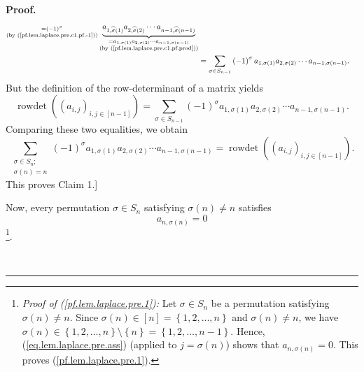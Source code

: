\documentclass
[numbers=enddot,12pt,final,onecolumn,notitlepage,english]{scrartcl}%
\theoremstyle{definition}
\newenvironment{proof}[1][Proof]{\noindent\textbf{#1.} }{\ \rule{0.5em}{0.5em}}
\let\sumnonlimits\sum
\renewcommand{\sum}{\sumnonlimits\limits}
\newenvironment{verlong}{}{}
\begin{document}
\begin{verlong}
\begin{proof}
\begin{align*}
{{}}_{\substack{=\left(  -1\right)  ^{\sigma}\\\text{(by
(\ref{pf.lem.laplace.pre.c1.pf.-1}))}}}\underbrace{a_{1,\widehat{\sigma
}\left(  1\right)  }a_{2,\widehat{\sigma}\left(  2\right)  }\cdots
a_{n-1,\widehat{\sigma}\left(  n-1\right)  }}_{\substack{=a_{1,\sigma\left(
1\right)  }a_{2,\sigma\left(  2\right)  }\cdots a_{n-1,\sigma\left(
n-1\right)  }\\\text{(by (\ref{pf.lem.laplace.pre.c1.pf.prod}))}}}\\
&  =\sum_{\sigma\in S_{n-1}}\left(  -1\right)  ^{\sigma}a_{1,\sigma\left(
1\right)  }a_{2,\sigma\left(  2\right)  }\cdots a_{n-1,\sigma\left(
n-1\right)  }.
\end{align*}
But the definition of the row-determinant of a matrix yields%
\[
\operatorname*{rowdet}\left(  \left(  a_{i,j}\right)  _{i,j\in\left[
n-1\right]  }\right)  =\sum_{\sigma\in S_{n-1}}\left(  -1\right)  ^{\sigma
}a_{1,\sigma\left(  1\right)  }a_{2,\sigma\left(  2\right)  }\cdots
a_{n-1,\sigma\left(  n-1\right)  }.
\]
Comparing these two equalities, we obtain%
\[
\sum_{\substack{\sigma\in S_{n};\\\sigma\left(  n\right)  =n}}\left(
-1\right)  ^{\sigma}a_{1,\sigma\left(  1\right)  }a_{2,\sigma\left(  2\right)
}\cdots a_{n-1,\sigma\left(  n-1\right)  }=\operatorname*{rowdet}\left(
\left(  a_{i,j}\right)  _{i,j\in\left[  n-1\right]  }\right)  .
\]
This proves Claim 1.] \medskip

Now, every permutation $\sigma\in S_{n}$ satisfying $\sigma\left(  n\right)
\neq n$ satisfies
\begin{equation}
a_{n,\sigma\left(  n\right)  }=0 \label{pf.lem.laplace.pre.1}%
\end{equation}
\footnote{\textit{Proof of (\ref{pf.lem.laplace.pre.1}):} Let $\sigma\in
S_{n}$ be a permutation satisfying $\sigma\left(  n\right)  \neq n$. Since
$\sigma\left(  n\right)  \in\left[  n\right]  =\left\{  1,2,\ldots,n\right\}
$ and $\sigma\left(  n\right)  \neq n$, we have $\sigma\left(  n\right)
\in\left\{  1,2,\ldots,n\right\}  \setminus\left\{  n\right\}  =\left\{
1,2,\ldots,n-1\right\}  $. Hence, (\ref{eq.lem.laplace.pre.ass}) (applied to
$j=\sigma\left(  n\right)  $) shows that $a_{n,\sigma\left(  n\right)  }=0$.
This proves (\ref{pf.lem.laplace.pre.1}).}.


\end{proof}
\end{verlong}
\end{document}
